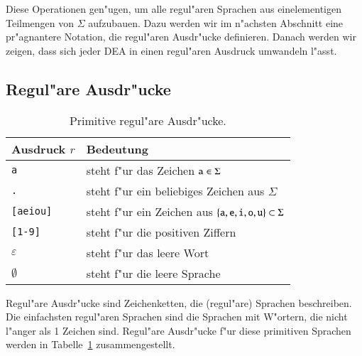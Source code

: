 Diese Operationen gen"ugen, um alle regul"aren Sprachen aus
einelementigen Teilmengen von $\Sigma$ aufzubauen.
Dazu werden wir im n"achsten Abschnitt eine pr"agnantere Notation,
die regul"aren Ausdr"ucke definieren. Danach werden wir zeigen,
dass sich jeder DEA in einen regul"aren Ausdruck umwandeln l"asst.

\subsection{Regul"are Ausdr"ucke\label{regulaer:regulaere-ausdruecke}}
\begin{table}
\begin{center}
\begin{tabular}{|l|l|}
\hline
Ausdruck $r$&Bedeutung\\
\hline
{\tt a}&steht f"ur das Zeichen ${\tt a}\in \Sigma$\\
{\tt .}&steht f"ur ein beliebiges Zeichen aus $\Sigma$\\
{\tt [aeiou]}&steht f"ur ein Zeichen aus $\{{\tt a},{\tt e},{\tt i},{\tt o},{\tt u}\}\subset \Sigma$\\
{\tt [1-9]}&steht f"ur die positiven Ziffern\\
$\varepsilon$&steht f"ur das leere Wort\\
$\emptyset$&steht f"ur die leere Sprache\\
\hline
\end{tabular}
\end{center}
\caption{Primitive regul"are Ausdr"ucke.\label{regtab1}}
\end{table}
Regul"are Ausdr"ucke sind Zeichenketten, die (regul"are) Sprachen
beschreiben. 
Die einfachsten regul"aren Sprachen sind die Sprachen mit W"ortern,
die nicht l"anger als 1 Zeichen sind. Regul"are Ausdr"ucke f"ur
diese primitiven Sprachen werden in Tabelle~\ref{regtab1} zusammengestellt.

